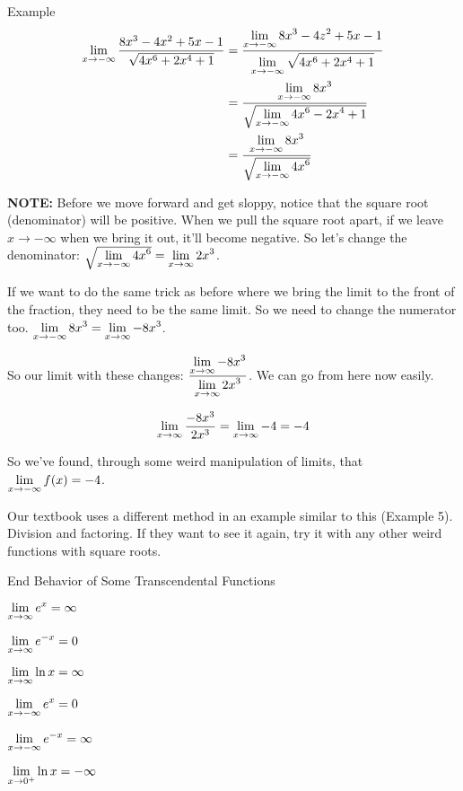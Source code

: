 \begin{note}{Example}
  \begin{align*}
    \displaystyle \lim_{x\to-\infty} \frac{8x^3-4x^2+5x-1}{\sqrt{4x^6+2x^4+1}} &= \dfrac{\displaystyle \lim_{x\to-\infty}8x^3-4z^2+5x-1}{\displaystyle \lim_{x\to-\infty}\sqrt{4x^6+2x^4+1}}\\
    & = \dfrac{\displaystyle \lim_{x\to-\infty} 8x^3}{\sqrt{\displaystyle \lim_{x\to-\infty} 4x^6-2x^4+1}}\\
    & = \dfrac{\displaystyle \lim_{x\to-\infty} 8x^3}{\sqrt{\displaystyle \lim_{x\to-\infty}4x^6}}
  \end{align*}

  \textbf{NOTE:} Before we move forward and get sloppy, notice that the square root (denominator) will be positive.
  When we pull the square root apart, if we leave $x\to-\infty$ when we bring it out, it'll become negative.
  So let's change the denominator: $\sqrt{\displaystyle \lim_{x\to-\infty}4x^6} = \displaystyle \lim_{x\to\infty}2x^3$.

  If we want to do the same trick as before where we bring the limit to the front of the fraction, they need to be the same limit.
  So we need to change the numerator too. $\displaystyle \lim_{x\to-\infty} 8x^3 = \displaystyle \lim_{x\to\infty}-8x^3$.

  So our limit with these changes: $\dfrac{\displaystyle \lim_{x\to\infty}-8x^3}{\displaystyle \lim_{x\to\infty}2x^3}$.
  We can go from here now easily.

  \[\displaystyle \lim_{x\to\infty}\dfrac{-8x^3}{2x^3}=\displaystyle \lim_{x\to\infty}-4=-4\]

  So we've found, through some weird manipulation of limits, that $\displaystyle \lim_{x\to-\infty} f(x) = -4$.
\end{note}

Our textbook uses a different method in an example similar to this (Example 5).
Division and factoring.
If they want to see it again, try it with any other weird functions with square roots.

\begin{defn}{End Behavior of Some Transcendental Functions} \hspace{2cm}
  \begin{multicols}{2}
    $\displaystyle \lim_{x\to \infty} e^x = \infty$

    $\displaystyle \lim_{x\to \infty} e^{-x} = 0$

    $\displaystyle \lim_{x\to \infty} \ln x = \infty$

    $\displaystyle \lim_{x\to -\infty} e^x = 0$

    $\displaystyle \lim_{x\to -\infty} e^{-x} = \infty$

    $\displaystyle \lim_{x\to 0^+} \ln x = -\infty$
  \end{multicols}
\end{defn}

